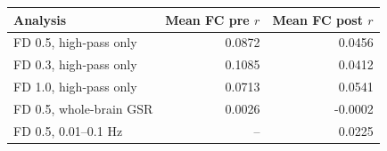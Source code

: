 \begin{tabular}{lrr}
\toprule
Analysis & Mean FC pre $r$ & Mean FC post $r$ \\
\midrule
FD 0.5, high-pass only & 0.0872 & 0.0456 \\
FD 0.3, high-pass only & 0.1085 & 0.0412 \\
FD 1.0, high-pass only & 0.0713 & 0.0541 \\
FD 0.5, whole-brain GSR & 0.0026 & -0.0002 \\
FD 0.5, 0.01--0.1 Hz & -- & 0.0225 \\
\bottomrule
\end{tabular}
